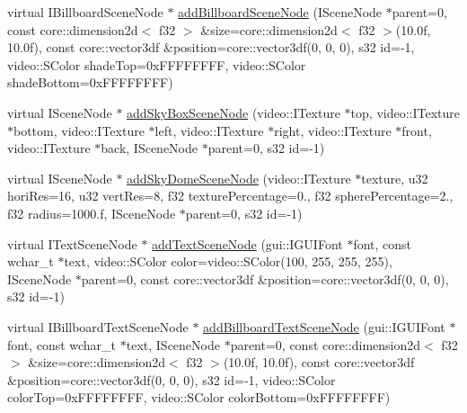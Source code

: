 \begin{DoxyCompactItemize}
\item 
virtual I\-Billboard\-Scene\-Node $\ast$ \hyperlink{classirr_1_1scene_1_1_c_scene_manager_adee31671738bcf2e93146b1c6ccd9023}{add\-Billboard\-Scene\-Node} (I\-Scene\-Node $\ast$parent=0, const core\-::dimension2d$<$ f32 $>$ \&size=core\-::dimension2d$<$ f32 $>$(10.\-0f, 10.\-0f), const core\-::vector3df \&position=core\-::vector3df(0, 0, 0), s32 id=-\/1, video\-::\-S\-Color shade\-Top=0x\-F\-F\-F\-F\-F\-F\-F\-F, video\-::\-S\-Color shade\-Bottom=0x\-F\-F\-F\-F\-F\-F\-F\-F)
\item 
virtual I\-Scene\-Node $\ast$ \hyperlink{classirr_1_1scene_1_1_c_scene_manager_a51b8cd28f5dc81b3518f4249fa1187f4}{add\-Sky\-Box\-Scene\-Node} (video\-::\-I\-Texture $\ast$top, video\-::\-I\-Texture $\ast$bottom, video\-::\-I\-Texture $\ast$left, video\-::\-I\-Texture $\ast$right, video\-::\-I\-Texture $\ast$front, video\-::\-I\-Texture $\ast$back, I\-Scene\-Node $\ast$parent=0, s32 id=-\/1)
\item 
virtual I\-Scene\-Node $\ast$ \hyperlink{classirr_1_1scene_1_1_c_scene_manager_ab61889c3eca09fa0cb70b3c9f8a25e92}{add\-Sky\-Dome\-Scene\-Node} (video\-::\-I\-Texture $\ast$texture, u32 hori\-Res=16, u32 vert\-Res=8, f32 texture\-Percentage=0., f32 sphere\-Percentage=2., f32 radius=1000.f, I\-Scene\-Node $\ast$parent=0, s32 id=-\/1)
\item 
virtual I\-Text\-Scene\-Node $\ast$ \hyperlink{classirr_1_1scene_1_1_c_scene_manager_ae9de85adb1c71933ba521daebe3b12be}{add\-Text\-Scene\-Node} (gui\-::\-I\-G\-U\-I\-Font $\ast$font, const wchar\-\_\-t $\ast$text, video\-::\-S\-Color color=video\-::\-S\-Color(100, 255, 255, 255), I\-Scene\-Node $\ast$parent=0, const core\-::vector3df \&position=core\-::vector3df(0, 0, 0), s32 id=-\/1)
\item 
\hypertarget{classirr_1_1scene_1_1_c_scene_manager_a36a6479253c81daf2f7f7376863f2515}{virtual I\-Billboard\-Text\-Scene\-Node $\ast$ \hyperlink{classirr_1_1scene_1_1_c_scene_manager_a36a6479253c81daf2f7f7376863f2515}{add\-Billboard\-Text\-Scene\-Node} (gui\-::\-I\-G\-U\-I\-Font $\ast$font, const wchar\-\_\-t $\ast$text, I\-Scene\-Node $\ast$parent=0, const core\-::dimension2d$<$ f32 $>$ \&size=core\-::dimension2d$<$ f32 $>$(10.\-0f, 10.\-0f), const core\-::vector3df \&position=core\-::vector3df(0, 0, 0), s32 id=-\/1, video\-::\-S\-Color color\-Top=0x\-F\-F\-F\-F\-F\-F\-F\-F, video\-::\-S\-Color color\-Bottom=0x\-F\-F\-F\-F\-F\-F\-F\-F)}\label{classirr_1_1scene_1_1_c_scene_manager_a36a6479253c81daf2f7f7376863f2515}


\end{DoxyCompactItemize}
